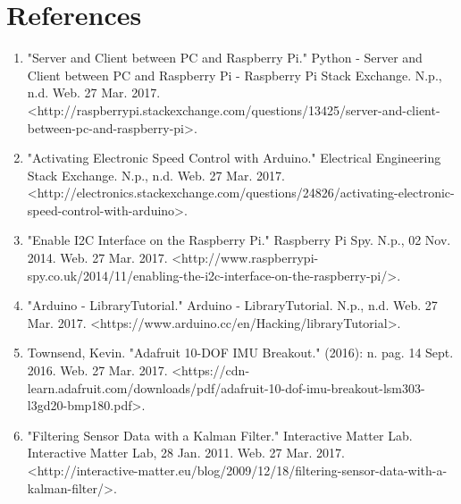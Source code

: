 \section{References}

\begin{enumerate}

\item "Server and Client between PC and Raspberry Pi." Python - Server and Client between PC and Raspberry Pi - Raspberry Pi Stack Exchange. N.p., n.d. Web. 27 Mar. 2017. <http://raspberrypi.stackexchange.com/questions/13425/server-and-client-between-pc-and-raspberry-pi>.

 \item "Activating Electronic Speed Control with Arduino." Electrical Engineering Stack Exchange. N.p., n.d. Web. 27 Mar. 2017. <http://electronics.stackexchange.com/questions/24826/activating-electronic-speed-control-with-arduino>.
 
 \item "Enable I2C Interface on the Raspberry Pi." Raspberry Pi Spy. N.p., 02 Nov. 2014. Web. 27 Mar. 2017. <http://www.raspberrypi-spy.co.uk/2014/11/enabling-the-i2c-interface-on-the-raspberry-pi/>.
 
 \item "Arduino - LibraryTutorial." Arduino - LibraryTutorial. N.p., n.d. Web. 27 Mar. 2017. <https://www.arduino.cc/en/Hacking/libraryTutorial>.
 
 \item Townsend, Kevin. "Adafruit 10-DOF IMU Breakout." (2016): n. pag. 14 Sept. 2016. Web. 27 Mar. 2017. <https://cdn-learn.adafruit.com/downloads/pdf/adafruit-10-dof-imu-breakout-lsm303-l3gd20-bmp180.pdf>.
 
 \item "Filtering Sensor Data with a Kalman Filter." Interactive Matter Lab. Interactive Matter Lab, 28 Jan. 2011. Web. 27 Mar. 2017. <http://interactive-matter.eu/blog/2009/12/18/filtering-sensor-data-with-a-kalman-filter/>.

\end{enumerate}